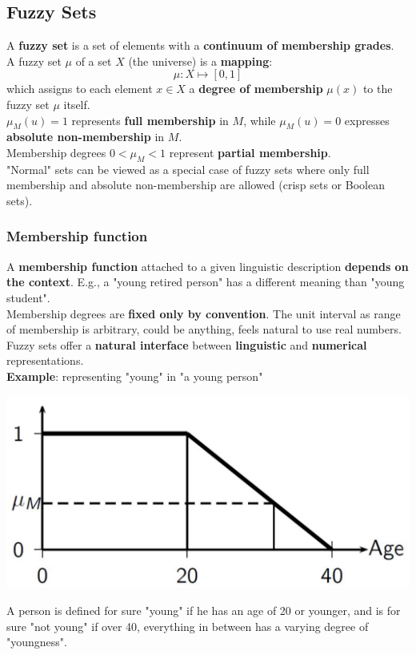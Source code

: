 \documentclass[11pt]{article}
\begin{document}
		\newpage
		
		\subsection{Fuzzy Sets}
		
		A \textbf{fuzzy set} is a set of elements with a \textbf{continuum of membership grades}.\\
		
		A fuzzy set $\mu$ of a set $X$ (the universe) is a \textbf{mapping}: 
		$$ \mu : X \mapsto [0,1] $$
		which assigns to each element $x \in X$ a \textbf{degree of membership} $\mu(x)$ to the fuzzy set $\mu$ itself.\\
		
		$\mu_M (u) = 1$ represents \textbf{full membership} in $M$, while $\mu_M (u) = 0$ expresses \textbf{absolute non-membership} in $M$.\\
		Membership degrees $0 < \mu_M < 1$ represent \textbf{partial membership}.\\
		
		"Normal" sets can be viewed as a special case of fuzzy sets where only full membership and absolute non-membership are allowed (crisp sets or Boolean sets).\\
		
		\newpage
		
		\subsubsection{Membership function}
		
		A \textbf{membership function} attached to a given linguistic description \textbf{depends on the context}. E.g., a "young retired person" has a different meaning than "young student".\\
		
		Membership degrees are \textbf{fixed only by convention}. The unit interval as range of membership is arbitrary, could be anything, feels natural to use real numbers.\\
		
		Fuzzy sets offer a \textbf{natural interface} between \textbf{linguistic} and \textbf{numerical} representations.\\
		
		\textbf{Example}: representing "young" in "a young person"
		\begin{center}
			\includegraphics[width=0.5\columnwidth]{img/FS/young1}
		\end{center}
		A person is defined for sure "young" if he has an age of 20 or younger, and is for sure "not young" if over 40, everything in between has a varying degree of "youngness".\\
		
\end{document}
